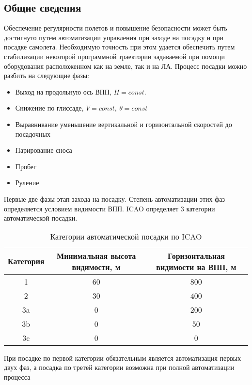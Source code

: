 \documentclass{article}
\begin{document}
\subsection{Общие сведения}
Обеспечение регулярности полетов и повышение безопасности может быть достигнуто
путем автоматизации управления при заходе на посадку и при посадке самолета.
Необходимую точность при этом удается обеспечить путем стабилизации некоторой
программной траектории задаваемой при помощи оборудования расположенном как на
земле, так и на ЛА.
Процесс посадки можно разбить на следующие фазы:
\begin{figure}[H]
	\centering
	\label{fig:fig_65}
\end{figure}
\begin{itemize}
	\item  Выход на продольную ось ВПП, $H=const$.
	\item Снижение по глиссаде, $V=const, \ \theta = const$
	\item Выравнивание уменьшение вертикальной и горизонтальной скоростей до
	      посадочных
	\item Парирование сноса
	\item Пробег
	\item Руление
\end{itemize}
Первые две фазы этап захода на посадку. Степень автоматизации этих фаз
определяется условием видимости ВПП. ICAO определяет 3 категории
автоматической посадки.
\begin{table}[H]
	\centering
	\caption{Категории автоматической посадки по ICAO}
	\label{tab:label}
	\begin{tabular}{|c|c|c|}
		\toprule
		Категория & Минимальная высота видимости, м & Горизонтальная видимости
		на ВПП, м                                                              \\
		\midrule
		1         & 60                              & 800
		\\
		2         & 30                              & 400
		\\
		3a        & 0                               & 200
		\\
		3b        & 0                               & 50
		\\
		3c        & 0                               & 0
		\\
		\bottomrule
	\end{tabular}
\end{table}
При посадке по первой категории обязательным является автоматизация первых двух
фаз, а посадка по третей категории возможна при полной автоматизации процесса
\end{document}
